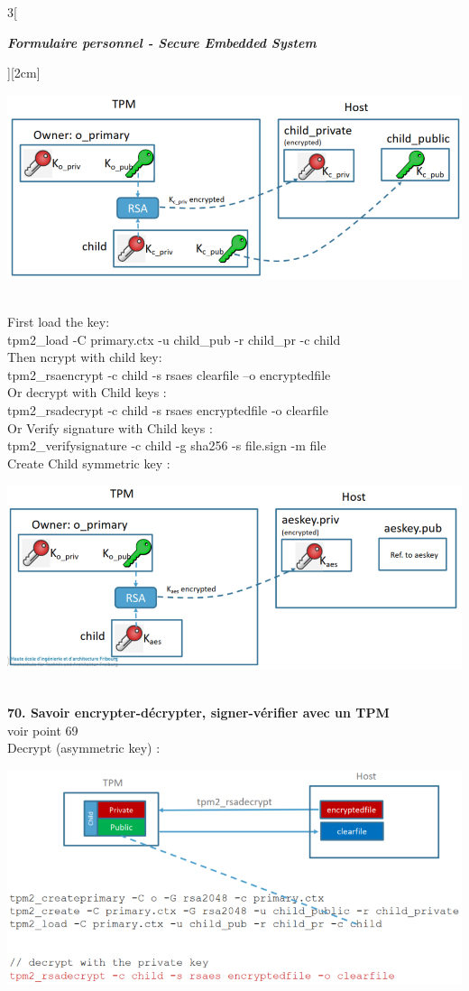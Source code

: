 \begin{multicols}{3}[\centerline{ \large\em \textbf{Formulaire personnel - Secure Embedded System}}][2cm]
\begin{minipage}{\linewidth}
	\centering
    \includegraphics[width =0.6\columnwidth]{images/49.png}
\end{minipage}\\
First load the key:\\
tpm2\_load -C primary.ctx -u child\_pub -r child\_pr -c child\\
Then ncrypt with child key: \\
tpm2\_rsaencrypt -c child -s rsaes clearfile –o encryptedfile\\
Or decrypt with Child keys :\\
tpm2\_rsadecrypt -c child -s rsaes encryptedfile -o clearfile\\
Or Verify signature with Child keys :\\
tpm2\_verifysignature -c child -g sha256 -s file.sign -m file\\
Create Child symmetric key :\\
\begin{minipage}{\linewidth}
	\centering
    \includegraphics[width =0.6\columnwidth]{images/57.png}
\end{minipage}\\
\textbf{70. Savoir encrypter-décrypter, signer-vérifier avec un TPM\\}
voir point 69\\ 
Decrypt (asymmetric key) :\\
\begin{minipage}{\linewidth}
	\centering
    \includegraphics[width =0.6\columnwidth]{images/54.png}

\end{minipage}
\end{multicols}
